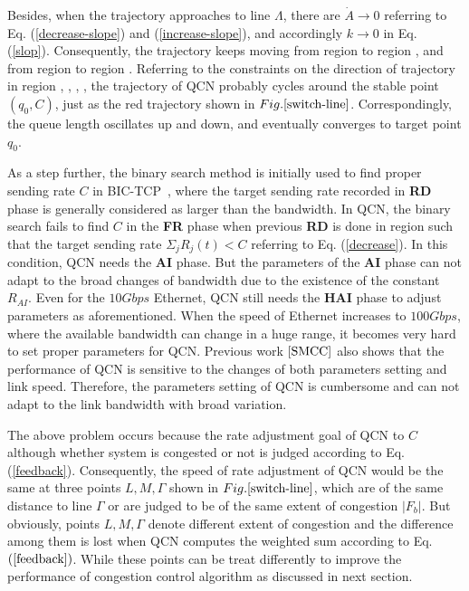\documentclass{sig-alternate-10pt}
\def\figurename{Fig.}
\begin{document}
Besides, when the trajectory approaches to line $\Lambda$, there are $\dot{A}\rightarrow0$ referring to Eq. (\ref{decrease-slope}) and (\ref{increase-slope}), and accordingly $k\rightarrow0$ in Eq. (\ref{slop}). Consequently, the trajectory keeps moving from region  to region , and from region  to region . Referring to the constraints on the direction of trajectory in region , , , , the trajectory of QCN probably cycles around the stable point $(q_0, C)$, just as the red trajectory shown in $\figurename{\ref{switch-line}}$. Correspondingly, the queue length oscillates up and down, and eventually converges to target point $q_0$.

As a step further, the binary search method is initially used to find proper sending rate $C$ in BIC-TCP~\cite{BIC}, where the target sending rate recorded in \textbf{RD} phase is generally considered as larger than the bandwidth. In QCN, the binary search fails to find $C$ in the \textbf{FR} phase when previous \textbf{RD} is done in region  such that the target sending rate $\Sigma_j R_j(t)<C$ referring to Eq. (\ref{decrease}). In this condition, QCN needs the \textbf{AI} phase. But the parameters of the  \textbf{AI} phase can not adapt to the broad changes of bandwidth due to the existence of the constant $R_{AI}$. Even for the $10Gbps$ Ethernet, QCN still needs the \textbf{HAI} phase to adjust parameters as aforementioned. When the speed of Ethernet increases to $100Gbps$, where the available bandwidth can change in a huge range, it becomes very hard to set proper parameters for QCN. Previous work $\cite{SMCC}$ also shows that the performance of QCN is sensitive to the changes of both parameters setting and link speed. Therefore, the parameters setting of QCN is cumbersome and can not adapt to the link bandwidth with broad variation. 

The above problem occurs because the rate adjustment goal of QCN to $C$ although whether system is congested or not is judged according to Eq. (\ref{feedback}). Consequently, the speed of rate adjustment of QCN would be the same at three points $L, M, \Gamma$ shown in $\figurename{\ref{switch-line}}$, which are of the same distance to line $\Gamma$ or are judged to be of the same extent of congestion $|F_b|$. But obviously, points $L, M, \Gamma$ denote different extent of congestion and the difference among them is lost when QCN computes the weighted sum according to Eq. $(\ref{feedback})$. While these points can be treat differently to improve the performance of congestion control algorithm as discussed in next section. 
\end{document}
